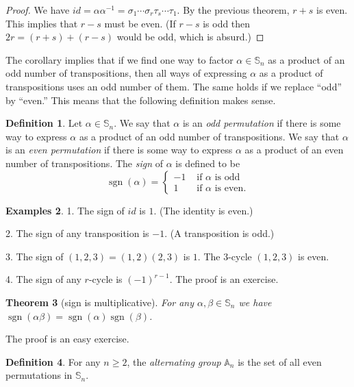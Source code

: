 \documentclass[11pt]{article}
\newtheorem{thm}{Theorem}[section]
\theoremstyle{definition}
\newtheorem{defn}[thm]{Definition}
\newtheorem{examples}[thm]{Examples}
\newcommand{\sgn}{\operatorname{sgn}}
\newcommand{\Sym}{\mathbb{S}}
\newcommand{\Alt}{\mathbb{A}}
\begin{document}
\begin{proof}
We have $id = \alpha \alpha^{-1} = \sigma_1 \cdots \sigma_r \tau_s
\cdots \tau_1$. By the previous theorem, $r+s$ is even. This implies
that $r-s$ must be even. (If $r-s$ is odd then $2r = (r+s) + (r-s)$
would be odd, which is absurd.)
\end{proof}

The corollary implies that if we find one way to factor $\alpha \in
\Sym_n$ as a product of an odd number of transpositions, then all ways
of expressing $\alpha$ as a product of transpositions uses an odd
number of them. The same holds if we replace ``odd'' by ``even.'' This
means that the following definition makes sense.


\begin{defn}
  Let $\alpha \in \Sym_n$. We say that $\alpha$ is an \emph{odd
    permutation} if there is some way to express $\alpha$ as a product
  of an odd number of transpositions.  We say that $\alpha$ is an
  \emph{even permutation} if there is some way to express $\alpha$ as
  a product of an even number of transpositions. The \emph{sign} of
  $\alpha$ is defined to be
  \[
    \sgn(\alpha) = 
    \begin{cases}
      -1 & \text{ if $\alpha$ is odd}\\
      1 & \text{ if $\alpha$ is even}.
    \end{cases}
  \]
\end{defn}


\begin{examples}
1. The sign of $id$ is $1$. (The identity is even.)  

2. The sign of any transposition is $-1$. (A transposition is odd.)

3. The sign of $(1,2,3) = (1,2)(2,3)$ is $1$. The $3$-cycle $(1,2,3)$
is even.  

4. The sign of any $r$-cycle is $(-1)^{r-1}$. The proof is an
exercise.
\end{examples}

\begin{thm}[sign is multiplicative]\label{thm:sign-is-mult}
  For any $\alpha, \beta \in \Sym_n$ we have $\sgn(\alpha \beta) =
  \sgn(\alpha) \sgn(\beta)$.
\end{thm}

The proof is an easy exercise. 

\begin{defn}\index{A@$\Alt_n$}
  For any $n \ge 2$, the \emph{alternating group} $\Alt_n$ is the set
  of all even permutations in $\Sym_n$.
\end{defn}
\end{document}
